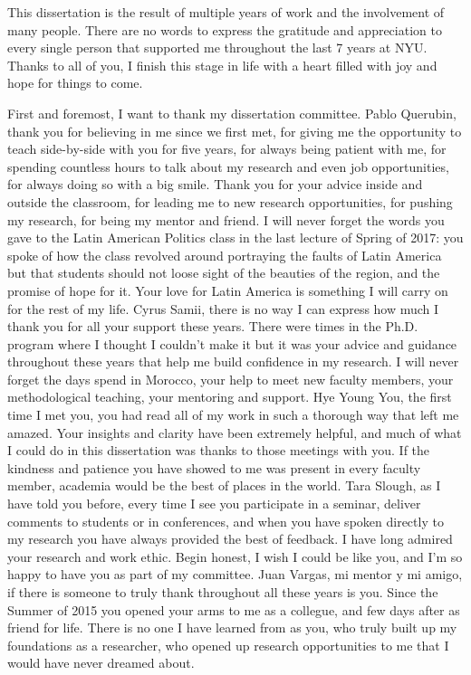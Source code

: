 


This dissertation is the result of multiple years of work and the involvement of many people. There are no words to express the gratitude and appreciation to every single person that supported me throughout the last 7 years at NYU. Thanks to all of you, I finish this stage in life with a heart filled with joy and hope for things to come. 

First and foremost, I want to thank my dissertation committee. Pablo Querubin, thank you for believing in me since we first met, for giving me the opportunity to teach side-by-side with you for five years, for always being patient with me, for spending countless hours to talk about my research and even job opportunities, for always doing so with a big smile. Thank you for your advice inside and outside the classroom, for leading me to new research opportunities, for pushing my research, for being my mentor and friend. I will never forget the words you gave to the Latin American Politics class in the last lecture of Spring of 2017: you spoke of how the class revolved around portraying the faults of Latin America but that students should not loose sight of the beauties of the region, and the promise of hope for it. Your love for Latin America is something I will carry on for the rest of my life. Cyrus Samii, there is no way I can express how much I thank you for all your support these years. There were times in the Ph.D. program where I thought I couldn't make it but it was your advice and guidance throughout these years that help me build confidence in my research. I will never forget the days spend in Morocco, your help to meet new faculty members, your methodological teaching, your mentoring and support. Hye Young You, the first time I met you, you had read all of my work in such a thorough way that left me amazed. Your insights and clarity have been extremely helpful, and much of what I could do in this dissertation was thanks to those meetings with you. If the kindness and patience you have showed to me was present in every faculty member, academia would be the best of places in the world. Tara Slough, as I have told you before, every time I see you participate in a seminar, deliver comments to students or in conferences, and when you have spoken directly to my research you have always provided the best of feedback. I have long admired your research and work ethic. Begin honest, I wish I could be like you, and I'm so happy to have you as part of my committee. Juan Vargas, mi mentor y mi amigo, if there is someone to truly thank throughout all these years is you. Since the Summer of 2015 you opened your arms to me as a collegue, and few days after as friend for life. There is no one I have learned from as you, who truly built up my foundations as a researcher, who opened up research opportunities to me that I would have never dreamed about. 

